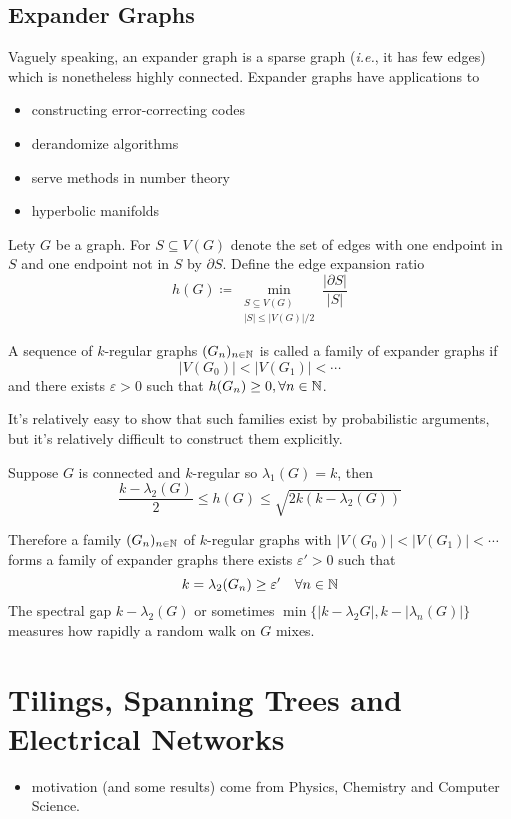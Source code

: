 \section{Expander Graphs}
Vaguely speaking, an expander graph is a sparse graph (\textit{i.e.}, it has few edges) which is nonetheless highly connected.
Expander graphs have applications to
\begin{itemize}
\item constructing error-correcting codes
\item derandomize algorithms
\item serve methods in number theory
\item hyperbolic manifolds
\end{itemize}

\begin{definition}
Lety \(G\) be a graph.
For \(S\subseteq V(G)\) denote the set of edges with one endpoint in \(S\) and one endpoint not in \(S\) by \(\partial S\).
Define the edge expansion ratio
\[ h(G)\coloneqq \min_{\substack{S\subseteq V(G)\\|S|\leq|V(G)|/2}} \frac{|\partial S|}{|S|} \]
\end{definition}
\begin{definition}
A sequence of \(k\)-regular graphs \((G_n)_{n\in\mathbb{N}}\) is called a family of expander graphs if
\[ |V(G_0)|<|V(G_1)|<\cdots \]
and there exists \(\varepsilon>0\) such that \(h(G_n)\geq0,\forall n\in\mathbb{N}\).
\end{definition}
\begin{remark}
It's relatively easy to show that such families exist by probabilistic arguments, but it's relatively difficult to construct them explicitly.
\end{remark}
\begin{theorem}
Suppose \(G\) is connected and \(k\)-regular so \(\lambda_1(G)=k\), then
\[ \frac{k-\lambda_2(G)}{2}\leq h(G)\leq \sqrt{2k(k-\lambda_2(G))} \]
\end{theorem}
Therefore a family \((G_n)_{n\in\mathbb{N}}\) of \(k\)-regular graphs with \(|V(G_0)|<|V(G_1)|<\cdots\) forms a family of expander graphs \iff there exists \(\varepsilon'>0\) such that
\[ k=\lambda_2(G_n)\geq\varepsilon' \quad \forall n\in\mathbb{N} \]
The spectral gap \(k-\lambda_2(G)\) or sometimes \( \min\{|k-\lambda_2{G}|,k-|\lambda_n(G)|\} \) measures how rapidly a random walk on \(G\) mixes.



\chapter[Tilings and Spanning Trees]{Tilings, Spanning Trees and Electrical Networks}
\begin{itemize}
\item motivation (and some results) come from Physics, Chemistry and Computer Science.
\end{itemize}

